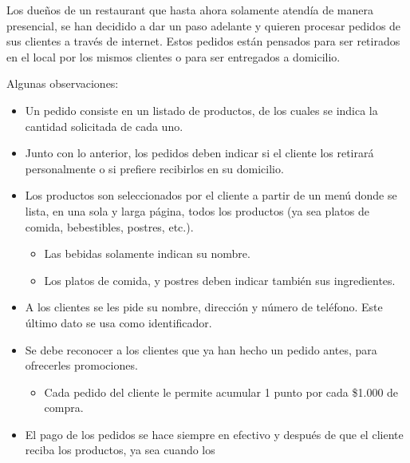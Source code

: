 \documentclass[11pt,letterpaper]{article}
\begin{document}
\begin{spacing}{1.2}
\thispagestyle{empty}
\evaluationTitle

\newcommand{\separatorLine}{\begin{center}\rule{.6\textwidth}{1pt}\end{center}}

\begin{Problem}

    Los dueños de un restaurant que hasta ahora solamente atendía de manera presencial, se
    han decidido a dar un paso adelante y quieren procesar pedidos de sus clientes a través
    de internet.  Estos pedidos
    están pensados para ser retirados en el local por los mismos clientes o para ser entregados a domicilio.

    Algunas observaciones:
    \begin{itemize}
        \item Un pedido consiste en un listado de productos, de los cuales se indica la cantidad solicitada de cada uno.
        \item Junto con lo anterior, los pedidos deben indicar si el cliente
            los retirará personalmente o si prefiere recibirlos en su domicilio.
        \item Los productos son seleccionados por el cliente a partir de un menú donde se lista, en una sola y larga
            página, todos los productos (ya sea platos de comida, bebestibles, postres, etc.).
        \begin{itemize}
            \item Las bebidas solamente indican su nombre.
            \item Los platos de comida,  y postres deben indicar también sus ingredientes.
        \end{itemize}
        \item A los clientes se les pide su nombre, dirección y número de teléfono. Este último dato
            se usa como identificador.
        \item Se debe reconocer a los clientes que ya han hecho un pedido antes, para ofrecerles promociones.
        \begin{itemize}
            \item Cada pedido del cliente le permite acumular 1 punto por cada \$1.000 de compra.
        \end{itemize}
        \item El pago de los pedidos se hace siempre en efectivo y 
            después de que el cliente reciba los productos, ya sea cuando los

\end{itemize}
\end{Problem}
\end{spacing}
\end{document}
